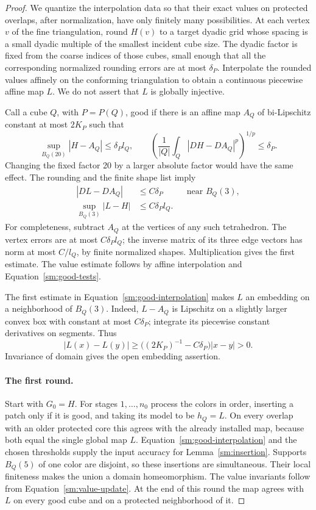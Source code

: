 \begin{proof}
We quantize the interpolation data so that their exact values on
protected overlaps, after normalization, have only finitely many
possibilities.  At each vertex $v$ of the fine triangulation, round $H(v)$
to a target dyadic grid whose spacing is a small dyadic
multiple of the smallest incident cube size.  The dyadic
factor is fixed from the coarse indices of those cubes,
small enough that all the corresponding normalized
rounding errors are at most $\delta_P$.  Interpolate
the rounded values affinely on the conforming
triangulation to obtain a continuous piecewise affine
map $L$.  We do not assert that $L$ is globally injective.

Call a cube $Q$, with $P=P(Q)$, good if there is an affine
map $A_Q$ of bi-Lipschitz constant at most $2K_P$ such that
\begin{equation}
 \label{sm:good-tests}
 \sup_{B_Q(20)}|H-A_Q|\le\delta_P l_Q,
 \qquad
 \left(\frac{1}{|Q|}\int_Q|DH-DA_Q|^p\right)^{1/p}\le\delta_P.
\end{equation}
Changing the fixed factor 20 by a larger absolute factor
would have the same effect.  The rounding and the finite
shape list imply
\begin{equation}
 \label{sm:good-interpolation}
 \begin{aligned}
 |DL-DA_Q|&\le C\delta_P
 &&\text{near }B_Q(3),\\
 \sup_{B_Q(3)}|L-H|&\le C\delta_P l_Q.
 \end{aligned}
\end{equation}
For completeness, subtract $A_Q$ at the vertices of any
such tetrahedron.  The vertex errors are at most
$C\delta_P l_Q$; the inverse matrix of its three edge
vectors has norm at most $C/l_Q$, by finite normalized
shapes.  Multiplication gives the first estimate.
The value estimate follows by affine interpolation
and Equation~\eqref{sm:good-tests}.

The first estimate in Equation~\eqref{sm:good-interpolation} makes
$L$ an embedding on a neighborhood of $B_Q(3)$.
Indeed, $L-A_Q$ is Lipschitz on a slightly larger convex
box with constant at most $C\delta_P$; integrate its
piecewise constant derivatives on segments.  Thus
\[
 |L(x)-L(y)|\ge
 \bigl((2K_P)^{-1}-C\delta_P\bigr)|x-y|>0.
\]
Invariance of domain gives the open embedding assertion.

\paragraph{The first round.}
Start with $G_0=H$.  For stages $1,\ldots,n_0$ process the
colors in order, inserting a patch only if it is good,
and taking its model to be $h_Q=L$.  On every overlap
with an older protected core this agrees with the
already installed map, because both equal the single
global map $L$.  Equation~\eqref{sm:good-interpolation}
and the chosen thresholds supply the input accuracy
for Lemma~\ref{sm:insertion}.  Supports $B_Q(5)$ of one
color are disjoint, so these insertions are simultaneous.
Their local finiteness makes the union a domain
homeomorphism.  The value invariants follow from
Equation~\eqref{sm:value-update}.  At the end of this round the
map agrees with $L$ on every good cube and on a
protected neighborhood of it.


\end{proof}
